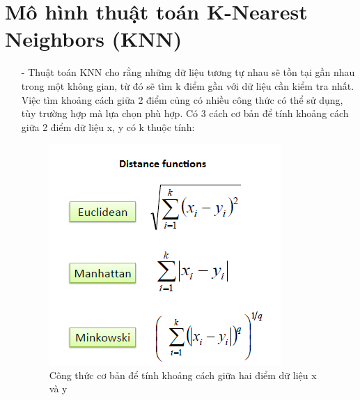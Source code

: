 \documentclass{report}
\begin{document}
    \section{Mô hình thuật toán K-Nearest Neighbors (KNN)}
        \begin{enumerate}
            \item [- ] Thuật toán KNN cho rằng những dữ liệu tương tự nhau sẽ tồn tại gần nhau trong một không gian, từ đó sẽ tìm k điểm gần với dữ liệu cần kiểm tra nhất. Việc tìm khoảng cách giữa 2 điểm củng có nhiều công thức có thể sử dụng, tùy trường hợp mà lựa chọn phù hợp. Có 3 cách cơ bản để tính khoảng cách giữa 2 điểm dữ liệu x, y có k thuộc tính:
                \begin{center}
                    \begin{figure}[htp]
                        \begin{center}
                            \includegraphics[scale = 1.2]{image/Distance.png}
                            \caption{Công thức cơ bản để tính khoảng cách giữa hai điểm dữ liệu x và y}
                        \end{center}
                    \end{figure}
                \end{center}    
                
            \pagebreak
            

\end{enumerate}
\end{document}
